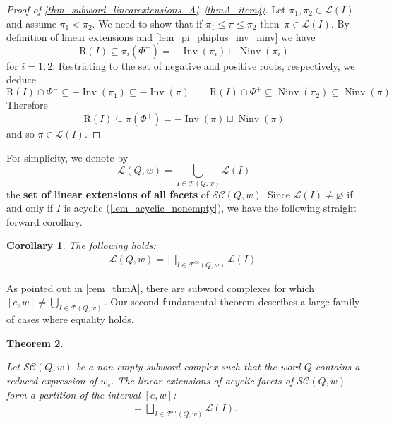 \documentclass{amsart}
\newtheorem{theorem}{Theorem}[section]
\newtheorem{corollary}[theorem]{Corollary}
\theoremstyle{definition}
\DeclareMathOperator{\Inv}{Inv} %
\DeclareMathOperator{\Ninv}{Ninv} %
\newcommand{\defn}[1]{\textbf{\textsf{\color{PineGreen} #1}}} %
\newcommand{\linearExtensions}{\mathcal{L}} %
\newcommand{\wo}{w_\circ} %
\newcommand{\subwordComplex}{\mathcal{SC}} %
\newcommand{\Roots}{\mathrm{R}} %
\newcommand{\subwordFacets}{\mathcal{F}} %
\newcommand{\subwordAcyclicFacets}{\mathcal{F}^{ac}} %
\begin{document}
\begin{proof}[Proof of \cref{thm_subword_linearextensions_A}~\eqref{thmA_item4}]
Let $\pi_1,\pi_2\in \linearExtensions(I)$ and assume $\pi_1<\pi_2$.
We need to show that if $\pi_1\leq \pi \leq \pi_2$ then~$\pi \in \linearExtensions(I)$.
By definition of linear extensions and \cref{lem_pi_phiplus_inv_ninv} we have
\[
\Roots(I) \subseteq \pi_i(\Phi^+)=-\Inv(\pi_i)\sqcup \Ninv(\pi_i)
\]
for $i=1,2$.
Restricting to the set of negative and positive roots, respectively, we deduce
\[
\Roots(I)\cap \Phi^- \subseteq -\Inv(\pi_1) \subseteq -\Inv(\pi) \qquad 
\Roots(I)\cap \Phi^+ \subseteq \Ninv(\pi_2)  \subseteq \Ninv(\pi)
\]
Therefore
\[
\Roots(I) \subseteq \pi(\Phi^+)=-\Inv(\pi)\sqcup \Ninv(\pi)
\]
and so $\pi\in \linearExtensions(I)$.
\end{proof}



For simplicity, we denote by 
\[
\linearExtensions(Q,w) = \bigcup_{I\in\subwordFacets(Q,w)} \linearExtensions(I)
\]
the \defn{set of linear extensions of all facets} of $\subwordComplex(Q,w)$.
Since $\linearExtensions(I)\neq \varnothing$ if and only if $I$ is acyclic (\cref{lem_acyclic_nonempty}), we have the following straight forward corollary.

\begin{corollary}\label{cor_linearextensions_partition}
The following holds:    
\begin{align}
    \linearExtensions(Q,w) =
    \bigsqcup_{I\in\subwordAcyclicFacets(Q,w)} \linearExtensions(I).
\end{align}
\end{corollary}

As pointed out in \cref{rem_thmA}, there are subword complexes for which $[e,w] \neq \bigcup_{I\in\subwordFacets(Q,w)}$.
Our second fundamental theorem describes a large family of cases where equality holds.

\begin{theorem}\label{thm_subword_linearextensions_B}

Let $\subwordComplex(Q,w)$ be a non-empty subword complex such that the word $Q$ contains a reduced expression of $\wo$.
The linear extensions of acyclic facets of $\subwordComplex(Q,w)$ form a partition of the interval $[e,w]$:
\begin{align}
    [e,w] =
    \bigsqcup_{I\in\subwordAcyclicFacets(Q,w)} \linearExtensions(I).
\end{align}
\end{theorem}
\end{document}
